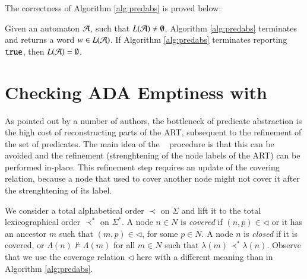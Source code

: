 \documentclass[10pt]{llncs}
\begin{document}
The correctness of Algorithm \ref{alg:predabs} is proved below:

\begin{theorem}\label{thm:predabs}
  Given an automaton $\mathcal{A}$, such that $L(\mathcal{A}) \neq \emptyset$, Algorithm
  \ref{alg:predabs} terminates and returns a word $w \in L(\mathcal{A})$. If
  Algorithm \ref{alg:predabs} terminates reporting $\mathtt{true}$, then
  $L(\mathcal{A}) = \emptyset$.
\end{theorem}

\section{Checking ADA Emptiness with \impact}

As pointed out by a number of authors, the bottleneck of predicate
abstraction is the high cost of reconstructing parts of the ART,
subsequent to the refinement of the set of predicates. The main idea
of the \impact~ procedure \cite{mcmillan06} is that this can be
avoided and the refinement (strenghtening of the node labels of the
ART) can be performed in-place. This refinement step requires an
update of the covering relation, because a node that used to cover
another node might not cover it after the strenghtening of its label.

We consider a total alphabetical order $\prec$ on $\Sigma$ and lift it
to the total lexicographical order $\prec^*$ on $\Sigma^*$. A node $n
\in N$ is \emph{covered} if $(n,p) \in \lhd$ or it has an ancestor $m$
such that $(m,p) \in \lhd$, for some $p \in N$. A node $n$ is
\emph{closed} if it is covered, or $\Lambda(n) \not\models \Lambda(m)$
for all $m \in N$ such that $\lambda(m) \prec^* \lambda(n)$. Observe
that we use the coverage relation $\lhd$ here with a different meaning
than in Algorithm \ref{alg:predabs}.
\end{document}
